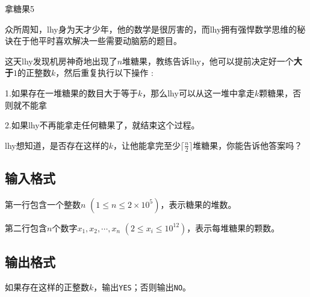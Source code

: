 \begin{Problem}{拿糖果}{5}

众所周知，lhy身为天才少年，他的数学是很厉害的，而lhy拥有强悍数学思维的秘诀在于他平时喜欢解决一些需要动脑筋的题目。

这天lhy发现机房神奇地出现了$n$堆糖果，教练告诉lhy，他可以提前决定好一个\textbf{大于}$1$的正整数$k$，然后重复执行以下操作 : 

1.如果存在一堆糖果的数目大于等于$k$，那么lhy可以从这一堆中拿走$k$颗糖果，否则就不能拿

2.如果lhy不再能拿走任何糖果了，就结束这个过程。

lhy想知道，是否存在这样的$k$，让他能拿完至少$\lceil \frac{n}{2} \rceil$堆糖果，你能告诉他答案吗？

\subsection*{输入格式}

第一行包含一个整数$n$ $(1 \leq n \leq 2 \times 10^5)$，表示糖果的堆数。

第二行包含$n$个数字$x_1, x_2, \cdots, x_n$ $(2 \leq x_i \leq 10^{12})$，表示每堆糖果的颗数。

\subsection*{输出格式}

如果存在这样的正整数$k$，输出\texttt{YES}；否则输出\texttt{NO}。



\end{Problem}

